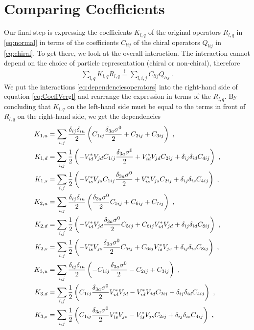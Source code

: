 \section{Comparing Coefficients}
Our final step is expressing the coefficients $K_{l,q}$ of the original operators $R_{l,q}$ in \eqref{eq:normal} in terms of the coefficients $C_{lij}$ of the chiral operators $Q_{lij}$ in \eqref{eq:chiral}. To get there, we look at the overall interaction. The interaction cannot depend on the choice of particle representation (chiral or non-chiral), therefore
\begin{align}\label{eq:CoeffVergl}
	\sum_{l,q} K_{l,q}R_{l,q} \overset{!}{=} \sum_{l,i,j}C_{lij}Q_{lij} \ .
\end{align}
We put the interactions \eqref{eq:dependenciesoperators} into the right-hand side of equation \eqref{eq:CoeffVergl} and rearrange the expression in terms of the $R_{l,q}$. By concluding that $K_{l,q}$ on the left-hand side must be equal to the terms in front of $R_{l,q}$ on the right-hand side, we get the dependencies
\begin{align}\label{eq:CoeffNormal}
	K_{1,u} &= \sum_{i,j}\frac{\delta_{ij}\delta_{iu}}{2}\left(C_{1ij}\frac{\delta_{3a}\sigma^0}{2}+ 
	C_{2ij} + C_{3ij}\right) \ , \notag \\
	K_{1,d} &= \sum_{i,j}\frac{1}{2}\left(-V_{id}^*V_{jd}C_{1ij}\frac{\delta_{3a}\sigma^0}{2}+ V_{id}^*V_{jd}C_{2ij} + \delta_{ij}\delta_{id}C_{4ij}\right) \ , \notag \\
	K_{1,s} &= \sum_{i,j}\frac{1}{2}\left(- V_{is}^*V_{js}C_{1ij}\frac{\delta_{3a}\sigma^0}{2}+ V_{is}^*V_{js}C_{2ij}+ \delta_{ij}\delta_{is}C_{4ij}\right) \ , \notag \\
	K_{2,u} &= \sum_{i,j}\frac{\delta_{ij}\delta_{iu}}{2}\left(\frac{\delta_{3a}\sigma^0}{2}C_{5ij}+ 
	C_{6ij} + C_{7ij}\right) \ , \notag \\
	K_{2,d} &= \sum_{i,j}\frac{1}{2}\left(- V_{id}^*V_{jd}\frac{\delta_{3a}\sigma^0}{2}C_{5ij} + C_{6ij}V_{id}^*V_{jd} + \delta_{ij}\delta_{id}C_{8ij}\right) \ , \notag \\
	K_{2,s} &= \sum_{i,j}\frac{1}{2}\left(- V_{is}^*V_{js}\frac{\delta_{3a}\sigma^0}{2}C_{5ij} + C_{6ij}V_{is}^*V_{js} + \delta_{ij}\delta_{is}C_{8ij}\right) \ , \notag \\
	K_{3,u} &= \sum_{i,j}\frac{\delta_{ij}\delta_{iu}}{2}\left(- C_{1ij}\frac{\delta_{3a}\sigma^0}{2} - C_{2ij} + C_{3ij}\right) \ , \notag \\
	K_{3,d} &= \sum_{i,j}\frac{1}{2}\left(C_{1ij}\frac{\delta_{3a}\sigma^0}{2} V_{id}^*V_{jd} - V_{id}^*V_{jd}C_{2ij} + \delta_{ij}\delta_{id}C_{4ij}\right) \ , \notag \\
	K_{3,s} &= \sum_{i,j}\frac{1}{2}\left(C_{1ij}\frac{\delta_{3a}\sigma^0}{2} V_{is}^*V_{js} - V_{is}^*V_{js}C_{2ij} + \delta_{ij}\delta_{is}C_{4ij}\right) \ , \notag %
\end{align}
